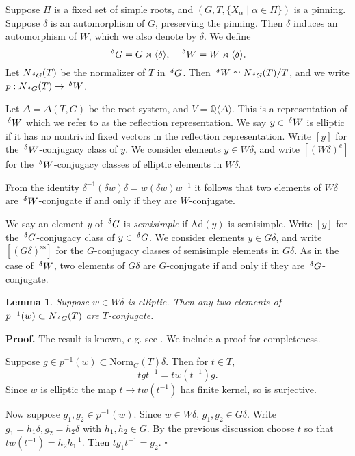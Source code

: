 \documentclass[10pt,leqno]{article}
\newtheorem{lemma}[equation]{Lemma}
\newcommand{\qed}{\hfill $\square$ \medskip}
\newenvironment{proof}[1][Proof]{\noindent\textbf{#1.} }{\qed}
\newcommand{\Ad}{\text{Ad}}
\newcommand{\Norm}{\text{Norm}}
\newcommand{\Q}{\mathbb Q}
\newcommand\inv{^{-1}}
\renewcommand{\ss}{\text{ss}}
\newcommand{\Wext}{\negthinspace\negthinspace\phantom{a}^\delta W}
\newcommand{\Gext}{\negthinspace\negthinspace\phantom{a}^\delta G}
\begin{document}
Suppose $\Pi$ is a fixed set of simple roots, and
$(G,T,\{X_\alpha\mid\alpha\in\Pi\})$ is a pinning.
Suppose $\delta$ is an automorphism of $G$, preserving
the pinning.
Then $\delta$ induces an
automorphism of $W$, which we also denote by $\delta$. We define
$$
\Gext=G \rtimes\langle\delta\rangle, \quad \Wext=W\rtimes\langle\delta\rangle.
$$
Let $N_{\Gext}(T)$ be the normalizer of $T$ in $\Gext$. 
Then $\Wext\simeq N_{\Gext}(T)/T$, and we write $p:N_{\Gext}(T)\rightarrow \Wext$.

Let $\Delta=\Delta(T,G)$ be the root system, and
$V=\Q\langle\Delta\rangle$. This is a representation of $\Wext$ which
we refer to as the reflection representation.  We say $y\in\Wext$ is
elliptic if it has no nontrivial fixed vectors in the reflection
representation.  Write $[y]$ for the $\Wext$-conjugacy class of
$y$. We consider elements $y\in W\delta$, and write $[(W\delta)^e]$
for the $\Wext$-conjugacy classes of elliptic elements in $W\delta$.

From the identity $\delta\inv(\delta w)\delta=w(\delta w)w\inv$ it
follows that two elements of $W\delta$ are $\Wext$-conjugate if and
only if they are $W$-conjugate.

We say an element $y$ of $\Gext$ is {\it semisimple} if $\Ad(y)$ is
semisimple.  Write $[y]$ for the $\Gext$-conjugacy class of
$y\in \Gext$. We consider elements $y\in G\delta$, and write
$[(G\delta)^{\ss}]$ for the $G$-conjugacy classes of semisimple
elements in $G\delta$.  As in the case of $\Wext$, two elements of
$G\delta$ are $G$-conjugate if and only if they are $\Gext$-conjugate.

\begin{lemma}
\label{l:conjugate}
Suppose $w\in W\delta$ is elliptic.
Then any two
elements of $p\inv(w)\subset N_{\Gext}(T)$ are $T$-conjugate.
\end{lemma}

\begin{proof}
The result is known, e.g. see \cite[Remark 4.1.1]{debacker_reeder}. We include a proof for completeness. 

Suppose $g\in p\inv(w)\subset \Norm_G(T)\delta$. 
Then for $t\in T$,
$$
tgt\inv=tw(t\inv)g.
$$
Since $w$ is elliptic the map $t\rightarrow tw(t\inv)$ has finite
kernel, so is surjective.

Now suppose $g_1,g_2\in p\inv(w)$.
Since $w\in W\delta$, $g_1,g_2\in G\delta$. Write $g_1=h_1\delta,g_2=h_2\delta$ with $h_1,h_2\in G$.
By the previous discussion choose $t$ so that $tw(t\inv)=h_2h_1\inv$. Then $tg_1t\inv=g_2$.
\end{proof}
\end{document}
